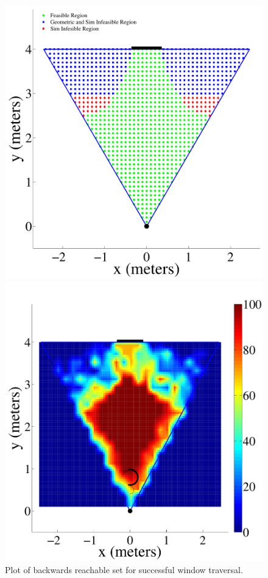 \documentclass{aamas2013}
\begin{document}
\begin{figure}[tb]
\begin{minipage}[b]{0.45\linewidth}
\includegraphics[width=\textwidth]{figures/feasible_set.pdf}
\caption{Plot of backwards reachable set for successful window traversal.}
\label{fig:feasible_set}
\end{minipage}
\hfill
\begin{minipage}[b]{0.45\linewidth}
\centering
\centering
\includegraphics[width=\textwidth]{figures/heat_map.pdf}

\end{minipage}
\end{figure}
\end{document}
